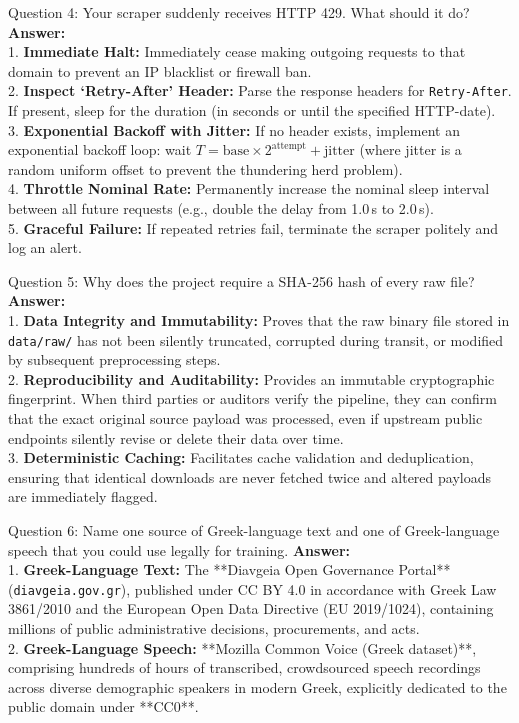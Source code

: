 \documentclass[11pt,a4paper]{article}
\begin{document}
\begin{testbox}{Question 4: Your scraper suddenly receives HTTP 429. What should it do?}
\textbf{Answer:}\\
1. \textbf{Immediate Halt:} Immediately cease making outgoing requests to that domain to prevent an IP blacklist or firewall ban.\\
2. \textbf{Inspect `Retry-After' Header:} Parse the response headers for \texttt{Retry-After}. If present, sleep for the duration (in seconds or until the specified HTTP-date).\\
3. \textbf{Exponential Backoff with Jitter:} If no header exists, implement an exponential backoff loop: wait $T = \text{base} \times 2^{\text{attempt}} + \text{jitter}$ (where jitter is a random uniform offset to prevent the thundering herd problem).\\
4. \textbf{Throttle Nominal Rate:} Permanently increase the nominal sleep interval between all future requests (e.g., double the delay from 1.0\,s to 2.0\,s).\\
5. \textbf{Graceful Failure:} If repeated retries fail, terminate the scraper politely and log an alert.
\end{testbox}

\begin{testbox}{Question 5: Why does the project require a SHA-256 hash of every raw file?}
\textbf{Answer:}\\
1. \textbf{Data Integrity and Immutability:} Proves that the raw binary file stored in \texttt{data/raw/} has not been silently truncated, corrupted during transit, or modified by subsequent preprocessing steps.\\
2. \textbf{Reproducibility and Auditability:} Provides an immutable cryptographic fingerprint. When third parties or auditors verify the pipeline, they can confirm that the exact original source payload was processed, even if upstream public endpoints silently revise or delete their data over time.\\
3. \textbf{Deterministic Caching:} Facilitates cache validation and deduplication, ensuring that identical downloads are never fetched twice and altered payloads are immediately flagged.
\end{testbox}

\begin{testbox}{Question 6: Name one source of Greek-language text and one of Greek-language speech that you could use legally for training.}
\textbf{Answer:}\\
1. \textbf{Greek-Language Text:} The **Diavgeia Open Governance Portal** (\texttt{diavgeia.gov.gr}), published under CC BY 4.0 in accordance with Greek Law 3861/2010 and the European Open Data Directive (EU 2019/1024), containing millions of public administrative decisions, procurements, and acts.\\
2. \textbf{Greek-Language Speech:} **Mozilla Common Voice (Greek dataset)**, comprising hundreds of hours of transcribed, crowdsourced speech recordings across diverse demographic speakers in modern Greek, explicitly dedicated to the public domain under **CC0**.
\end{testbox}
\end{document}
